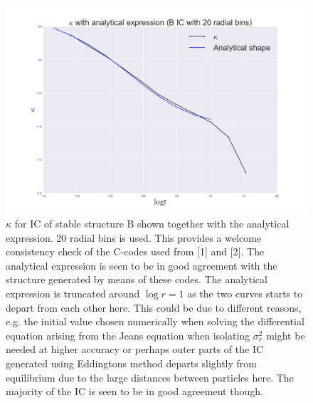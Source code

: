 \begin{figure}[!htbp]
\centering
\includegraphics[width=1.0\linewidth]{img/B_IC_kappa_logr_fit.png}
\caption{$\kappa$ for IC of stable structure B shown together with the analytical expression. 20 radial bins is used. This provides a welcome consistency check of the C-codes used from [1] and [2]. The analytical expression is seen to be in good agreement with the structure generated by means of these codes. The analytical expression is truncated around $\log r = 1$ as the two curves starts to depart from each other here. This could be due to different reasons, e.g. the initial value chosen numerically when solving the differential equation arising from the Jeans equation when isolating $\sigma_r^2$ might be needed at higher accuracy or perhaps outer parts of the IC generated using Eddingtons method departs slightly from equilibrium due to the large distances between particles here. The majority of the IC is seen to be in good agreement though.}
\label{fig:test}
\end{figure}

